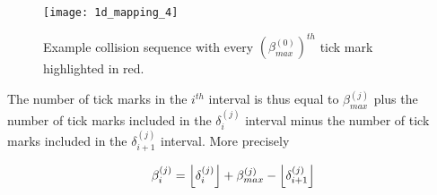 \begin{figure}[H]
  \begin{center}
    \texttt{[image: 1d\_mapping\_4]}
  \end{center}
  \vspace{-.2in} %
  \caption{\label{fig:a-sequence} Example collision sequence with every $(\beta^{(0)}_{max})^{th}$ tick mark highlighted in red.}
\end{figure}

The number of tick marks in the $i^{th}$ interval is thus equal to $\beta^{(j)}_{max}$ plus the number of tick marks included in the $\delta^{(j)}_i$ interval minus the number of tick marks included in the $\delta^{(j)}_{i+1}$ interval. More precisely

\begin{align}\label{eq:beta_i}
  \beta^{(j)}_i = \floor{\delta^{(j)}_i} + \beta^{(j)}_{max} - \floor{\delta^{(j)}_{i+1}}
\end{align}
